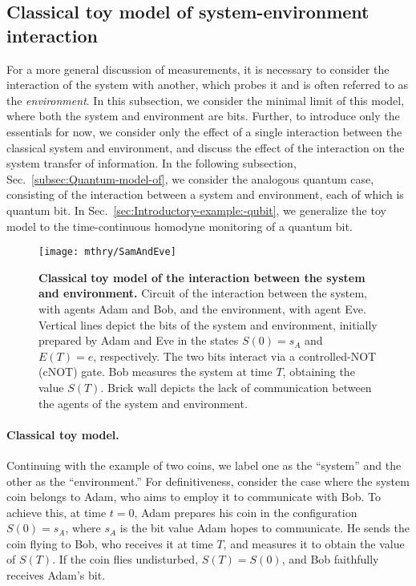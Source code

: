 \subsection{Classical toy model of system-environment interaction\label{subsec:Classical-model-of}}

For a more general discussion of measurements, it is necessary to
consider the interaction of the system with another, which probes
it and is often referred to as the \emph{environment}. In this subsection,
we consider the minimal limit of this model, where both the system
and environment are bits. Further, to introduce only the essentials
for now, we consider only the effect of a single interaction between
the classical system and environment, and discuss the effect of the
interaction on the system transfer of information. In the following
subsection, Sec.~\ref{subsec:Quantum-model-of}, we consider the
analogous quantum case, consisting of the interaction between a system
and environment, each of which is quantum bit. In Sec.~\ref{sec:Introductory-example:-qubit},
we generalize the toy model to the time-continuous homodyne monitoring
of a quantum bit. 

\begin{figure}
\begin{centering}
\texttt{[image: mthry/SamAndEve]}
\par\end{centering}
\caption[Classical toy model of the interaction between the system and environment]{\textbf{\label{fig:Reversibility-of-classical}Classical} \textbf{toy
model of the interaction between the system and environment.} Circuit
of the interaction between the system, with agents Adam and Bob, and
the environment, with agent Eve. Vertical lines depict the bits of
the system and environment, initially prepared by Adam and Eve in
the states $S\left(0\right)=s_{A}$ and $E\left(T\right)=e$, respectively.
The two bits interact via a controlled-NOT (cNOT) gate. Bob measures
the system at time $T$, obtaining the value $S\left(T\right)$. Brick
wall depicts the lack of communication between the agents of the system
and environment. }
\end{figure}


\paragraph{Classical toy model. }

Continuing with the example of two coins, we label one as the ``system''
and the other as the ``environment.'' For definitiveness, consider
the case where the system coin belongs to Adam, who aims to employ
it to communicate with Bob. To achieve this, at time $t=0$, Adam
prepares his coin in the configuration $S\left(0\right)=s_{A}$, where
$s_{A}$ is the bit value Adam hopes to communicate. He sends the
coin flying to Bob, who receives it at time $T$, and measures it
to obtain the value of $S\left(T\right)$. If the coin flies undisturbed,
$S\left(T\right)=S\left(0\right)$, and Bob faithfully receives Adam's
bit. 

